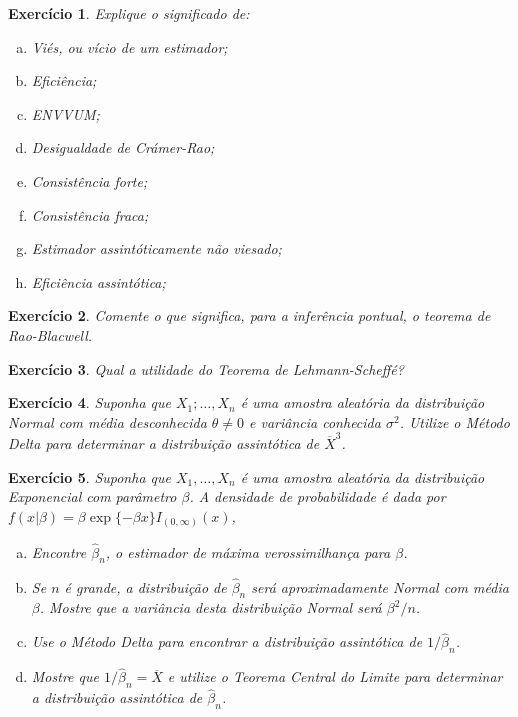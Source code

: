 \documentclass[letter,11pt]{article}
\newtheorem{exer}{Exercício}
\begin{document}

\begin{exer} \rm
Explique o significado de:
\begin{enumerate}[a)]
  \item Viés, ou vício de um estimador;
  \item Eficiência;
  \item ENVVUM;
  \item Desigualdade de Crámer-Rao;
  \item Consistência forte;
  \item Consistência fraca;
  \item Estimador assintóticamente não viesado;
  \item Eficiência assintótica;
\end{enumerate}
\end{exer}


\begin{exer} \rm
Comente o que significa, para a inferência pontual, o teorema de Rao-Blacwell.
\end{exer}


\begin{exer} \rm
Qual a utilidade do Teorema de Lehmann-Scheffé?
\end{exer}

\begin{exer} \rm
Suponha que $X_1; \ldots, X_n$ é uma amostra aleatória da distribuição Normal com média desconhecida $\theta \neq 0$ e variância conhecida $\sigma^2$. Utilize o Método Delta para determinar a distribuição assintótica de $\overline{X}^3$.
\end{exer}


\begin{exer} \rm
Suponha que $X_1, \ldots, X_n$ é uma amostra aleatória da distribuição Exponencial com parâmetro $\beta$. A densidade de probabilidade é dada por $f(x|\beta) = \beta\exp\{-\beta x\}I_{(0,\infty)}(x)$,
\begin{enumerate}[a)]
  \item Encontre $\hat{\beta}_n$, o estimador de máxima verossimilhança para $\beta$.
  \item Se $n$ é grande, a distribuição de $\hat{\beta}_n$ será aproximadamente Normal com média $\beta$. Mostre que a variância desta distribuição Normal será $\beta^2/n$.
  \item Use o Método Delta para encontrar a distribuição assintótica de $1/\hat{\beta}_n$.
  \item Mostre que $1/\hat{\beta}_n=\overline{X}$ e utilize o Teorema Central do Limite para determinar a distribuição assintótica de $\hat{\beta}_n$.
\end{enumerate}
\end{exer}
\end{document}
